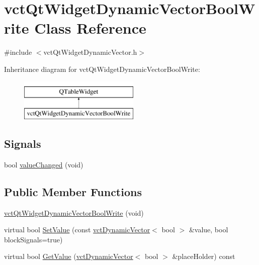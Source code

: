 \hypertarget{classvct_qt_widget_dynamic_vector_bool_write}{}\section{vct\+Qt\+Widget\+Dynamic\+Vector\+Bool\+Write Class Reference}
\label{classvct_qt_widget_dynamic_vector_bool_write}


{\ttfamily \#include $<$vct\+Qt\+Widget\+Dynamic\+Vector.\+h$>$}

Inheritance diagram for vct\+Qt\+Widget\+Dynamic\+Vector\+Bool\+Write\+:\begin{figure}[H]
\begin{center}
\leavevmode
\includegraphics[height=2.000000cm]{d0/d2f/classvct_qt_widget_dynamic_vector_bool_write}
\end{center}
\end{figure}
\subsection*{Signals}
\begin{DoxyCompactItemize}
\item 
bool \hyperlink{classvct_qt_widget_dynamic_vector_bool_write_af221dadaa68c5f19f25f6260cc9b5706}{value\+Changed} (void)
\end{DoxyCompactItemize}
\subsection*{Public Member Functions}
\begin{DoxyCompactItemize}
\item 
\hyperlink{classvct_qt_widget_dynamic_vector_bool_write_a4159076c7371573adfc72f3fec154151}{vct\+Qt\+Widget\+Dynamic\+Vector\+Bool\+Write} (void)
\item 
virtual bool \hyperlink{classvct_qt_widget_dynamic_vector_bool_write_a624eb508d13b7b832256b8658c2a1618}{Set\+Value} (const \hyperlink{classvct_dynamic_vector}{vct\+Dynamic\+Vector}$<$ bool $>$ \&value, bool block\+Signals=true)
\item 
virtual bool \hyperlink{classvct_qt_widget_dynamic_vector_bool_write_ad0e2ef93bce6aa3dde4236e69727e3a2}{Get\+Value} (\hyperlink{classvct_dynamic_vector}{vct\+Dynamic\+Vector}$<$ bool $>$ \&place\+Holder) const 
\end{DoxyCompactItemize}
